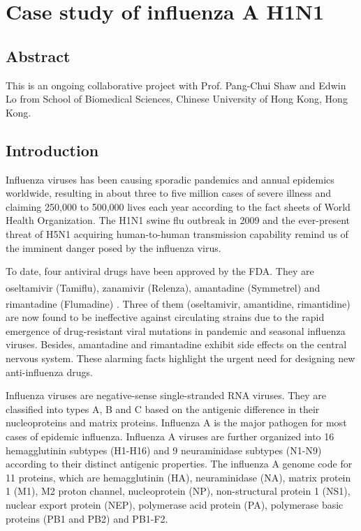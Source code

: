 \chapter{Case study of influenza A H1N1}

\section{Abstract}

This is an ongoing collaborative project with Prof. Pang-Chui Shaw and Edwin Lo from School of Biomedical Sciences, Chinese University of Hong Kong, Hong Kong.

\section{Introduction}

Influenza viruses has been causing sporadic pandemics and annual epidemics worldwide, resulting in about three to five million cases of severe illness and claiming 250,000 to 500,000 lives each year according to the fact sheets of World Health Organization. The H1N1 swine flu outbreak in 2009 and the ever-present threat of H5N1 acquiring human-to-human transmission capability remind us of the imminent danger posed by the influenza virus.

To date, four antiviral drugs have been approved by the FDA. They are oseltamivir (Tamiflu\textsuperscript{\textregistered}), zanamivir (Relenza\textsuperscript{\textregistered}), amantadine (Symmetrel\textsuperscript{\textregistered}) and rimantadine (Flumadine\textsuperscript{\textregistered}) \citep{1229}. Three of them (oseltamivir, amantidine, rimantidine) are now found to be ineffective against circulating strains due to the rapid emergence of drug-resistant viral mutations in pandemic and seasonal influenza viruses. Besides, amantadine and rimantadine exhibit side effects on the central nervous system. These alarming facts highlight the urgent need for designing new anti-influenza drugs.

Influenza viruses are negative-sense single-stranded RNA viruses. They are classified into types A, B and C based on the antigenic difference in their nucleoproteins and matrix proteins. Influenza A is the major pathogen for most cases of epidemic influenza. Influenza A viruses are further organized into 16 hemagglutinin subtypes (H1-H16) and 9 neuraminidase subtypes (N1-N9) according to their distinct antigenic properties. The influenza A genome code for 11 proteins, which are hemagglutinin (HA), neuraminidase (NA), matrix protein 1 (M1), M2 proton channel, nucleoprotein (NP), non-structural protein 1 (NS1), nuclear export protein (NEP), polymerase acid protein (PA), polymerase basic proteins (PB1 and PB2) and PB1-F2.

